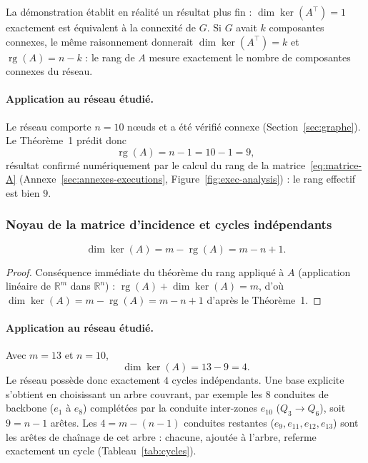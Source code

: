 \documentclass[11pt]{ama-article}
\begin{document}
\begin{remarque}
La démonstration établit en réalité un résultat plus fin : $\dim\ker(A^\top)=1$ exactement est
équivalent à la connexité de $G$. Si $G$ avait $k$ composantes connexes, le même raisonnement
donnerait $\dim\ker(A^\top)=k$ et $\operatorname{rg}(A)=n-k$ : le rang de $A$ mesure exactement
le nombre de composantes connexes du réseau.
\end{remarque}

\paragraph{Application au réseau étudié.} Le réseau comporte $n=10$ nœuds et a été vérifié
connexe (Section~\ref{sec:graphe}). Le Théorème~1 prédit donc
\begin{equation}
\operatorname{rg}(A) = n-1 = 10-1 = 9,
\end{equation}
résultat confirmé numériquement par le calcul du rang de la matrice~\eqref{eq:matrice-A}
(Annexe~\ref{sec:annexes-executions}, Figure~\ref{fig:exec-analysis}) : le rang effectif est
bien $9$.

\subsubsection{Noyau de la matrice d'incidence et cycles indépendants}

\begin{corollaire}
\begin{equation}
\dim\ker(A) = m - \operatorname{rg}(A) = m-n+1.
\label{eq:dim-ker-A}
\end{equation}
\end{corollaire}

\begin{proof}
Conséquence immédiate du théorème du rang appliqué à $A$ (application linéaire de
$\mathbb{R}^m$ dans $\mathbb{R}^n$) : $\operatorname{rg}(A)+\dim\ker(A)=m$, d'où
$\dim\ker(A)=m-\operatorname{rg}(A)=m-n+1$ d'après le Théorème~1.
\end{proof}

\paragraph{Application au réseau étudié.} Avec $m=13$ et $n=10$,
\begin{equation}
\dim\ker(A) = 13-9 = 4.
\end{equation}
Le réseau possède donc exactement $4$ cycles indépendants. Une base explicite s'obtient en
choisissant un arbre couvrant, par exemple les $8$ conduites de backbone ($e_1$ à $e_8$)
complétées par la conduite inter-zones $e_{10}$ ($Q_3\to Q_6$), soit $9=n-1$ arêtes. Les
$4=m-(n-1)$ conduites restantes ($e_9,e_{11},e_{12},e_{13}$) sont les arêtes de chaînage de cet
arbre : chacune, ajoutée à l'arbre, referme exactement un cycle (Tableau~\ref{tab:cycles}).
\end{document}
